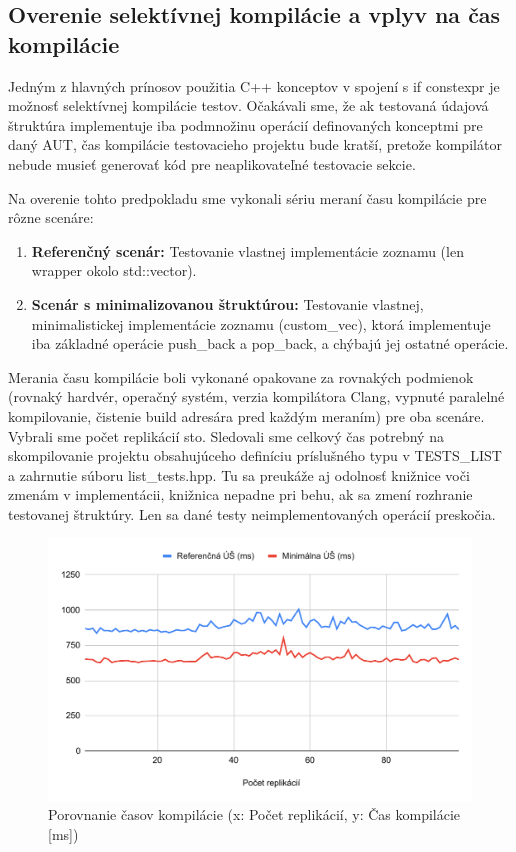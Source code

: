 \documentclass[11pt]{article}
\begin{document}
\subsection{Overenie selektívnej kompilácie a vplyv na čas kompilácie}

Jedným z hlavných prínosov použitia C++ konceptov v spojení s if constexpr je možnosť selektívnej kompilácie testov. Očakávali sme, že ak testovaná údajová štruktúra implementuje iba podmnožinu operácií definovaných konceptmi pre daný AUT, čas kompilácie testovacieho projektu bude kratší, pretože kompilátor nebude musieť generovať kód pre neaplikovateľné testovacie sekcie.

\noindent Na overenie tohto predpokladu sme vykonali sériu meraní času kompilácie pre rôzne scenáre:

\begin{enumerate}
    \item \textbf{Referenčný scenár:} Testovanie vlastnej implementácie zoznamu (len wrapper okolo std::vector).
    \item \textbf{Scenár s minimalizovanou štruktúrou:} Testovanie vlastnej, minimalistickej implementácie zoznamu (custom\_vec), ktorá implementuje iba základné operácie push\_back a pop\_back, a chýbajú jej ostatné operácie.
\end{enumerate}

Merania času kompilácie boli vykonané opakovane za rovnakých podmienok (rovnaký hardvér, operačný systém, verzia kompilátora Clang, vypnuté paralelné kompilovanie, čistenie build adresára pred každým meraním) pre oba scenáre. Vybrali sme počet replikácií sto. Sledovali sme celkový čas potrebný na skompilovanie projektu obsahujúceho definíciu príslušného typu v TESTS\_LIST a zahrnutie súboru list\_tests.hpp. Tu sa preukáže aj odolnosť knižnice voči zmenám v implementácii, knižnica nepadne pri behu, ak sa zmení rozhranie testovanej štruktúry. Len sa dané testy neimplementovaných operácií preskočia.

\begin{figure}[H]
    \centering
    \includegraphics[width=\textwidth]{compilation_time.pdf}
    \caption{Porovnanie časov kompilácie (x: Počet replikácií, y: Čas kompilácie [ms])}
    \label{fig:kompilacia_cas}
\end{figure}
\end{document}
